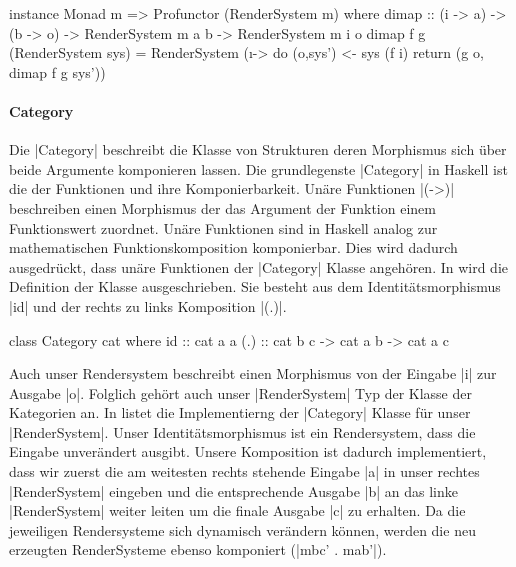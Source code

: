 \begin{haskell}[label={lst:rendersystem-profunctor},caption={Profunctor Instanz für RenderSystem}]
instance Monad m => Profunctor (RenderSystem m) where
  dimap :: (i -> a) -> (b -> o) -> RenderSystem m a b -> RenderSystem m i o
  dimap f g (RenderSystem sys) = RenderSystem (\i -> do
    (o,sys') <- sys (f i)
    return (g o, dimap f g sys'))
\end{haskell}



\paragraph{Category}

Die |Category| beschreibt die Klasse von Strukturen deren Morphismus sich über beide Argumente komponieren lassen. Die grundlegenste |Category| in Haskell ist die der Funktionen und ihre Komponierbarkeit. Unäre Funktionen |(->)| beschreiben einen Morphismus der das Argument der Funktion einem Funktionswert zuordnet. Unäre Funktionen sind in Haskell analog zur mathematischen Funktionskomposition komponierbar. Dies wird dadurch ausgedrückt, dass unäre Funktionen der |Category| Klasse angehören. In  wird die Definition der Klasse ausgeschrieben. Sie besteht aus dem Identitätsmorphismus |id| und der rechts zu links Komposition |(.)|.

\begin{haskell}[label={lst:class-category},caption={Category Klasse\protect\footnotemark},nolol]
class Category cat where
  id :: cat a a
  (.) :: cat b c -> cat a b -> cat a c
\end{haskell}

Auch unser Rendersystem beschreibt einen Morphismus von der Eingabe |i| zur Ausgabe |o|. Folglich gehört auch unser |RenderSystem| Typ der Klasse der Kategorien an. In  listet die Implementierng der |Category| Klasse für unser |RenderSystem|. Unser Identitätsmorphismus ist ein Rendersystem, dass die Eingabe unverändert ausgibt. Unsere Komposition ist dadurch implementiert, dass wir zuerst die am weitesten rechts stehende Eingabe |a| in unser rechtes |RenderSystem| eingeben und die entsprechende Ausgabe |b| an das linke |RenderSystem| weiter leiten um die finale Ausgabe |c| zu erhalten. Da die jeweiligen Rendersysteme sich dynamisch verändern können, werden die neu erzeugten RenderSysteme ebenso komponiert (|mbc' . mab'|). 

